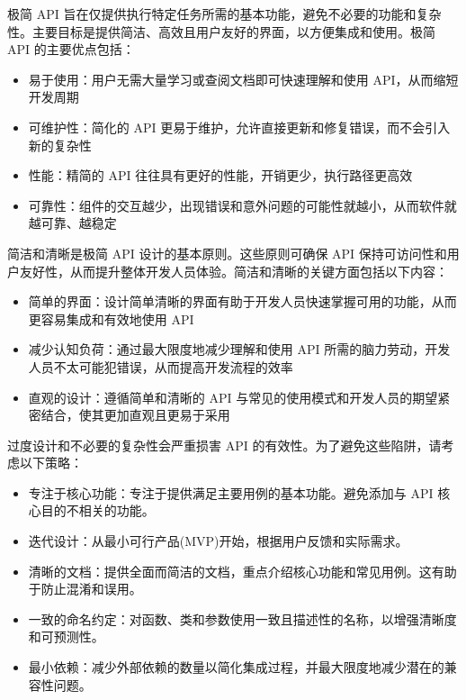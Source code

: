 极简 API 旨在仅提供执行特定任务所需的基本功能，避免不必要的功能和复杂性。主要目标是提供简洁、高效且用户友好的界面，以方便集成和使用。极简 API 的主要优点包括：

\begin{itemize}
\item
易于使用：用户无需大量学习或查阅文档即可快速理解和使用 API，从而缩短开发周期

\item
可维护性：简化的 API 更易于维护，允许直接更新和修复错误，而不会引入新的复杂性

\item
性能：精简的 API 往往具有更好的性能，开销更少，执行路径更高效

\item
可靠性：组件的交互越少，出现错误和意外问题的可能性就越小，从而软件就越可靠、越稳定
\end{itemize}

简洁和清晰是极简 API 设计的基本原则。这些原则可确保 API 保持可访问性和用户友好性，从而提升整体开发人员体验。简洁和清晰的关键方面包括以下内容：

\begin{itemize}
\item
简单的界面：设计简单清晰的界面有助于开发人员快速掌握可用的功能，从而更容易集成和有效地使用 API

\item
减少认知负荷：通过最大限度地减少理解和使用 API 所需的脑力劳动，开发人员不太可能犯错误，从而提高开发流程的效率

\item
直观的设计：遵循简单和清晰的 API 与常见的使用模式和开发人员的期望紧密结合，使其更加直观且更易于采用
\end{itemize}

过度设计和不必要的复杂性会严重损害 API 的有效性。为了避免这些陷阱，请考虑以下策略：

\begin{itemize}
\item
专注于核心功能：专注于提供满足主要用例的基本功能。避免添加与 API 核心目的不相关的功能。

\item
迭代设计：从最小可行产品(MVP)开始，根据用户反馈和实际需求。

\item
清晰的文档：提供全面而简洁的文档，重点介绍核心功能和常见用例。这有助于防止混淆和误用。

\item
一致的命名约定：对函数、类和参数使用一致且描述性的名称，以增强清晰度和可预测性。

\item
最小依赖：减少外部依赖的数量以简化集成过程，并最大限度地减少潜在的兼容性问题。
\end{itemize}









